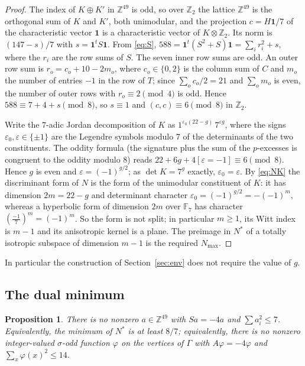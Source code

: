 \documentclass[11pt]{amsart}
\newtheorem{proposition}[theorem]{Proposition}
\theoremstyle{definition}
\theoremstyle{remark}
\newcommand{\Z}{\mathbb{Z}}
\newcommand{\F}{\mathbb{F}}
\newcommand{\G}{\Gamma}
\newcommand{\s}{\sigma}
\begin{document}
\begin{proof}
The index of $K\oplus K'$ in $\Z^{49}$ is odd, so over $\Z_2$ the lattice $\Z^{49}$ is the orthogonal sum of $K$ and $K'$, both
unimodular, and the projection $c=H\mathbf 1/7$ of the characteristic vector $\mathbf 1$ is a characteristic vector of
$K\otimes\Z_2$. Its norm is $(147-s)/7$ with $s=\mathbf 1^{t}S\mathbf 1$. From \eqref{eq:S},
$588=\mathbf 1^{t}(S^2+S)\mathbf 1=\sum_i r_i^2+s$, where the $r_i$ are the row sums of $S$. The seven inner row sums are odd.
An outer row sum is $r_o=c_o+10-2m_o$, where $c_o\in\{0,2\}$ is the column sum of $C$ and $m_o$ the number of entries $-1$ in
the row of $T$; since $\sum_o c_o/2=21$ and $\sum_o m_o$ is even, the number of outer rows with $r_o\equiv 2\pmod 4$ is odd.
Hence $588\equiv 7+4+s\pmod 8$, so $s\equiv 1$ and $(c,c)\equiv 6\pmod 8$ in $\Z_2$.

Write the $7$-adic Jordan decomposition of $K$ as $1^{\varepsilon_0(22-g)}\,7^{\varepsilon g}$, where the signs
$\varepsilon_0,\varepsilon\in\{\pm1\}$ are the Legendre symbols modulo $7$ of the determinants of the two constituents. The oddity formula
\cite[Ch.~15]{SPLAG} (the signature plus the sum of the $p$-excesses is congruent to the oddity modulo $8$) reads
$22+6g+4[\varepsilon=-1]\equiv 6\pmod 8$. Hence $g$ is even and $\varepsilon=(-1)^{g/2}$; as $\det K=7^g$ exactly,
$\varepsilon_0=\varepsilon$. By \eqref{eq:NK} the discriminant form of $N$ is the form of the unimodular constituent of $K$:
it has dimension $2m=22-g$ and determinant character $\varepsilon_0=(-1)^{g/2}=-(-1)^m$, whereas a hyperbolic form of
dimension $2m$ over $\F_7$ has character $\left(\frac{-1}{7}\right)^m=(-1)^m$. So the form is not split; in particular
$m\ge1$, its Witt index is $m-1$ and its anisotropic kernel is a plane. The preimage in $N^*$ of a totally isotropic subspace
of dimension $m-1$ is the required $N_{\max}$.
\end{proof}

In particular the construction of Section~\ref{sec:env} does not require the value of $g$.

\subsection{The dual minimum}

\begin{proposition}\label{prop:87}
There is no nonzero $a\in\Z^{49}$ with $Sa=-4a$ and $\sum a_i^2\le 7$. Equivalently, the minimum of $N^*$ is at least $8/7$;
equivalently, there is no nonzero integer-valued $\s$-odd function $\varphi$ on the vertices of $\G$ with
$A\varphi=-4\varphi$ and $\sum_x\varphi(x)^2\le 14$.
\end{proposition}
\end{document}

